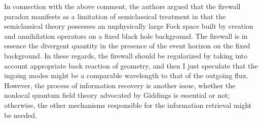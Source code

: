 \documentclass[aps,preprint,a4paper,showpacs,showkeys,superscriptaddress]{revtex4-1}
\begin{document}
In connection with the above comment,
the authors \cite{Nomura:2016qum} argued that the firewall paradox manifests as a limitation of semiclassical treatment
in that the semiclassical theory possesses an unphysically large Fock space
built by creation and annihilation operators on a fixed black hole background.
The firewall is in essence the divergent quantity in the presence of the event horizon
on the fixed background. In these regards, the firewall should be regularized
by taking into account appropriate back reaction of geometry, and then
I just speculate that the ingoing modes might be a comparable wavelength to that of the outgoing flux.
However, the process of information recovery is another issue,
whether the nonlocal quantum field theory advocated by Giddings \cite{Giddings:2013kcj}  is essential or not;
otherwise, the other mechanisms responsible for the information retrieval might be needed.
\end{document}

